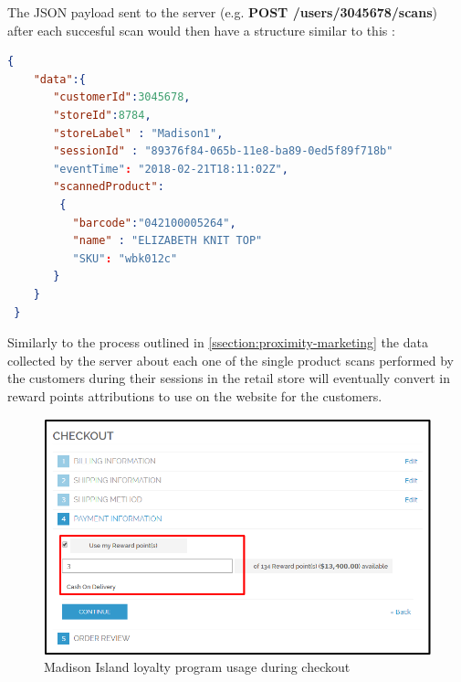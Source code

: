 The JSON payload sent to the server (e.g. \textbf{POST /users/3045678/scans}) after each succesful scan would then have a structure similar to this :

\vspace{0.5cm}
\begin{lstlisting}[language=json,firstnumber=1]
  {
    "data":{
       "customerId":3045678,
       "storeId":8784,
       "storeLabel" : "Madison1",
       "sessionId" : "89376f84-065b-11e8-ba89-0ed5f89f718b"
       "eventTime": "2018-02-21T18:11:02Z",
       "scannedProduct":
        {
          "barcode":"042100005264",
          "name" : "ELIZABETH KNIT TOP"
          "SKU": "wbk012c"    
       }
    }
 }
  \end{lstlisting}
\vspace{0.5cm}

Similarly to the process outlined in \ref{ssection:proximity-marketing} the data collected by the server about each one of the single product scans performed by the customers during their sessions in the retail store will eventually convert in reward points attributions to use on the website for the customers. 

\vspace{0.5cm}
\begin{figure}[H]
  \centering
    \includegraphics[width=12cm]{images/loyalty-reward-points.png}
  \caption{Madison Island loyalty program usage during checkout}
  \label{fig:loyalty-points}
\end{figure}
\vspace{0.5cm}





